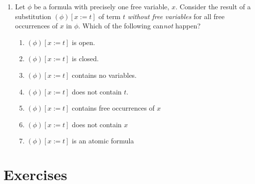 \begin{enumerate}[\thesection.1]
  \item Let $\phi$ be a formula with precisely one free variable, $x$.
	Consider the result of a substitution $(\phi)[x:=t]$ of term $t$ \emph{without free variables}
	for all free occurrences of $x$ in $\phi$.
	Which of the following can\emph{not} happen?

\begin{enumerate}
\item $(\phi)[x:=t]$ is open.
\item $(\phi)[x:=t]$ is closed.
\item $(\phi)[x:=t]$ contains no variables.
\item $(\phi)[x:=t]$ does not contain $t$.
\item $(\phi)[x:=t]$ contains free occurrences of $x$
\item $(\phi)[x:=t]$ does not contain $x$
\item $(\phi)[x:=t]$ is an atomic formula
\end{enumerate}
  
\end{enumerate}


\section{Exercises}
	
